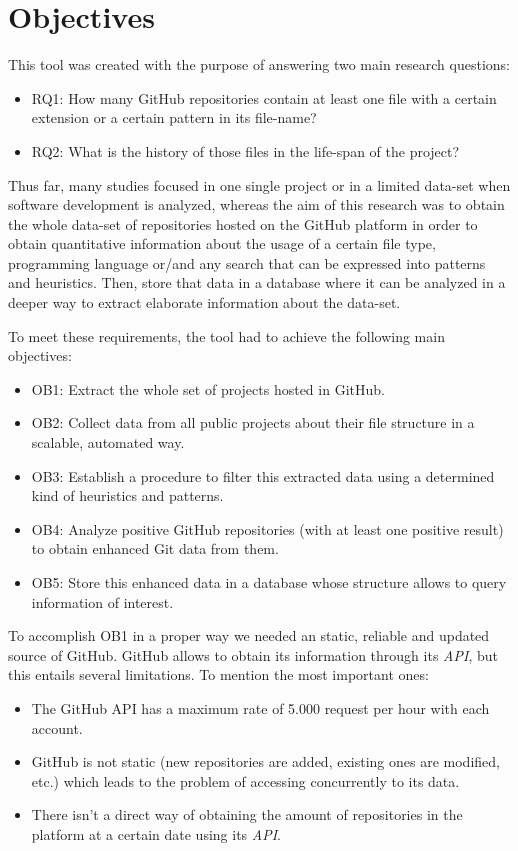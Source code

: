 \documentclass[a4paper, 12pt]{book}
\begin{document}
\chapter{Objectives}
\label{sec:objectives}
This tool was created with the purpose of answering two main research questions:
\begin{itemize}
  \item RQ1: How many GitHub repositories contain at least one file with a certain extension or a certain
        pattern in its file-name?
  \item RQ2: What is the history of those files in the life-span of the project?
\end{itemize}
Thus far, many studies focused in one single project or in a limited data-set when software development is analyzed,
whereas the aim of this research was to obtain the whole data-set of repositories hosted on the GitHub platform
in order to obtain quantitative information about the usage of a certain file type, programming language
or/and any search that can be expressed into patterns and heuristics. Then, store that data in a database
where it can be analyzed in a deeper way to extract elaborate information about the data-set.\par
To meet these requirements, the tool had to achieve the following main objectives:
\begin{itemize}
  \item OB1: Extract the whole set of projects hosted in GitHub.
  \item OB2: Collect data from all public projects about their file structure in a scalable, automated way.
  \item OB3: Establish a procedure to filter this extracted data using a determined kind of heuristics and patterns.
  \item OB4: Analyze positive GitHub repositories (with at least one positive result) to obtain enhanced Git data from them.
  \item OB5: Store this enhanced data in a database whose structure allows to query information of interest.
\end{itemize}
To accomplish OB1 in a proper way we needed an static, reliable and updated source of GitHub.
GitHub allows to obtain its information through its \textit{API},
but this entails several limitations. To mention the most important ones:
\begin{itemize}
    \item The GitHub API has a maximum rate of 5.000 request per hour with each account.
    \item GitHub is not static (new repositories are added, existing ones are modified, etc.) which leads to the problem of
    accessing concurrently to its data.
    \item There isn't a direct way
    of obtaining the amount of repositories in the platform at a certain date using its \textit{API}.
\end{itemize}
\end{document}
